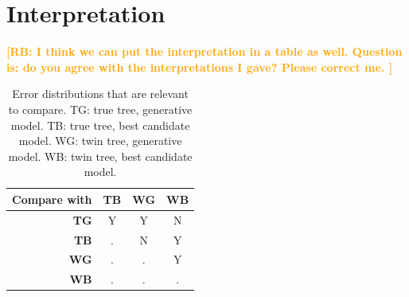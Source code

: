 \documentclass{article}
\newcommand{\richel}[1]{\textcolor{orange}{\textbf{[RB: #1]}}}
\begin{document}
\section{Interpretation}

\richel{
  I think we can put the interpretation in a table as well.
  Question is: do you agree with the interpretations I gave?
  Please correct me.
}

\begin{table}
  \begin{tabular}{ | r | c | c | c | }
    \hline
    \textbf{Compare with} & \textbf{TB} & \textbf{WG} & \textbf{WB} \\ 
    \hline
    \textbf{TG} & Y & Y & N \\
    \textbf{TB} & . & N & Y \\
    \textbf{WG} & . & . & Y \\
    \textbf{WB} & . & . & . \\
    \hline
  \end{tabular}
  \caption{
    Error distributions that are relevant to compare.
    TG: true tree, generative model.
    TB: true tree, best candidate model.
    WG: twin tree, generative model.
    WB: twin tree, best candidate model.
  }
  \label{tab:relevant_comparisions}
\end{table}
\end{document}
